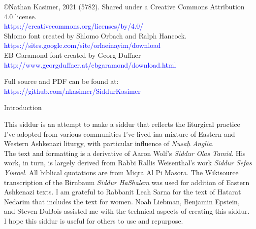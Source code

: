 \author{מסודר ע״י
\\
\textbf{ﭏיעזר בן זאב וואלף קזימיר}}
\date{נוסח אשכנז}

\maketitle

\begin{minipage}[b][\textheight][b]{\textwidth}
\begin{english}
\raggedright
\vfill
©Nathan Kasimer, 2021 (5782). Shared under a Creative Commons Attribution 4.0 license.\\
\textcolor{blue}{https://creativecommons.org/licenses/by/4.0/}\\

Shlomo font created by Shlomo Orbach and Ralph Hancock.\\ \textcolor{blue}{https://sites.google.com/site/orlaeinayim/download}\\EB Garamond font created by Georg Duffner\\\textcolor{blue}{http://www.georgduffner.at/ebgaramond/download.html}

Full \XeLaTeX \quad source and PDF can be found at:\\ \textcolor{blue}{https://github.com/nkasimer/Siddur\textunderscore Kasimer}


\end{english}
\end{minipage}
\clearpage
\begin{minipage}{\textwidth}

\begin{english}
\begin{center} %
\begin{LARGE}
Introduction
\end{LARGE}
\end{center}

This siddur is an attempt to make a siddur that reflects the liturgical practice I've adopted from various communities I've lived in\textemdash a mixture of Eastern and Western Ashkenazi liturgy, with particular influence of \textit{Nusa\d{h} Anglia}.\\

The text and formatting is a derivative of Aaron Wolf's \textit{Siddur Olas Tamid}.  His work, in turn, is largely derived from Rabbi Rallis Weisenthal's work \textit{Siddur Sefas Yisroel}. All biblical quotations are from Miqra Al Pi Masora. The Wikisource transcription of the Birnbaum \textit{Siddur HaShalem} was used for addition of Eastern Ashkenazi texts. I am grateful to Rabbanit Leah Sarna for the text of Hatarat Nedarim that includes the text for women.  Noah Liebman, Benjamin Epstein, and Steven DuBois assisted me with the technical aspects of creating this siddur.\\

I hope this siddur is useful for others to use and repurpose.

\end{english}

\end{minipage}

